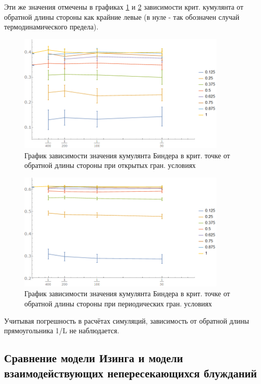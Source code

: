 Эти же значения отмечены в графиках \ref{fig:CumulOBCL} и \ref{fig:CumulPBCL} зависимости крит. кумулянта от обратной длины стороны как крайние левые (в нуле - так обозначен случай термодинамического предела).

\begin{figure}[!h]
    \centering
    \includegraphics[width=100mm]{Sections/Images/CumulantOBCL.png}
    \caption{График зависимости значения кумулянта Биндера в крит. точке от обратной длины стороны при открытых гран. условиях}
    \label{fig:CumulOBCL}
\end{figure}

\begin{figure}[!h]
    \centering
    \includegraphics[width=100mm]{Sections/Images/CumulantPBCL.png}
    \caption{График зависимости значения кумулянта Биндера в крит. точке от обратной длины стороны при периодических гран. условиях}
    \label{fig:CumulPBCL}
\end{figure}

Учитывая погрешность в расчётах симуляций, зависимость от обратной длины прямоугольника 1/L не наблюдается.

\subsection{Сравнение модели Изинга и модели взаимодействующих непересекающихся блужданий}

